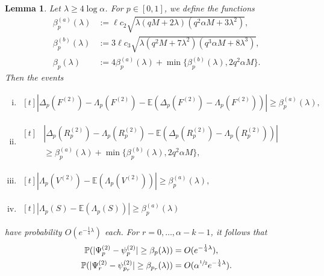 \documentclass{article}
\theoremstyle{plain}
\theoremstyle{remark}
\theoremstyle{plain}
\newtheorem{lemma}[theorem]{Lemma}
\numberwithin{equation}{section}
\begin{document}
	\begin{lemma}\label{lemma_vu}
		Let $\lambda\geq4\log\alpha$. For $p\in[0,1]$, we define the functions
		\begin{align}
			\beta^{(a)}_p(\lambda)&:=\ell c_2\sqrt{\lambda(qM+2\lambda)(q^2\alpha M+3\lambda^2)},
			\\\beta^{(b)}_p(\lambda)&:=3\ell c_3\sqrt{\lambda(q^2M+7\lambda^2)(q^3\alpha M+8\lambda^3)},
			\\\beta_p(\lambda)&:=4\beta^{(a)}_p(\lambda)+\min\{\beta^{(b)}_p(\lambda),2q^2\alpha M\}.
		\end{align}
		Then the events
		\begin{enumerate}[(i)]
			\item\label{lemma_vu_f} $\begin{aligned}[t]
				|\Delta_p(F^{(2)})-\Lambda_p(F^{(2)})-\mathbb{E}(\Delta_p(F^{(2)})-\Lambda_p(F^{(2)}))|\geq\beta^{(a)}_p(\lambda),
			\end{aligned}$
			\item\label{lemma_vu_r} $\begin{aligned}[t]
				&|\Delta_p(R_p^{(2)})-\Lambda_p(R_p^{(2)})-\mathbb{E}(\Delta_p(R_p^{(2)})-\Lambda_p(R_p^{(2)}))|\\&\geq\beta^{(a)}_p(\lambda)+\min\{\beta^{(b)}_p(\lambda),2q^2\alpha M\},
			\end{aligned}$
			\item\label{lemma_vu_v} $\begin{aligned}[t]
				|\Lambda_p(V^{(2)})-\mathbb{E}(\Lambda_p(V^{(2)}))|\geq\beta^{(a)}_p(\lambda),
			\end{aligned}$
			\item\label{lemma_vu_s} $\begin{aligned}[t]
				|\Lambda_p(S)-\mathbb{E}(\Lambda_p(S))|\geq\beta^{(a)}_p(\lambda)
			\end{aligned}$
		\end{enumerate}
		have probability $O(e^{-\frac14\lambda})$ each. For $r=0,\ldots,\alpha-k-1$, it follows that
		\begin{align}
			\mathbb{P}(|\Psi_p^{(2)}-\psi_p^{(2)}|\geq\beta_p(\lambda))&=O(e^{-\frac14\lambda}),
			\\\mathbb{P}(|\Psi_r^{(2)}-\psi_{p_r}^{(2)}|\geq\beta_{p_r}(\lambda))&=O(\alpha^{\sfrac12}e^{-\frac14\lambda}).
		\end{align}
	\end{lemma}
	
\end{document}
